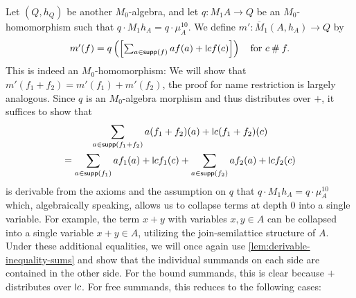 \documentclass[11pt,a4paper]{amsart}
\newcommand{\fresh}{\mathbin{\#}}
\newcommand{\supp}{\mathsf{supp}}
\newcommand{\mbar}{\overline{M}_1}
\theoremstyle{plain}
\newcommand{\midmid}{\hspace{0.2ex}{\rule[-0.1ex]{0.6pt}{1.65ex}}\hspace{0.2ex}}
\newcommand{\newletter}[1]{{\midmid}#1}
\numberwithin{equation}{section}
\newcommand{\+}[1]{\mathcal{#1}\xspace}
\theoremstyle{definition}
\begin{document}
Let \((Q, h_Q)\) be another \(M_0\)-algebra, and let \(q\colon M_1A \to Q\) be an $M_0$-homomorphism such that \(q \cdot M_1h_A = q \cdot \mu^{10}_A\).
We define \(m'\colon \mbar(A, h_A) \to Q\) by
\begin{equation*}\textstyle
  m'(f) = q\left( \left[ \sum_{a \in \supp(f)} a f(a) + \newletter{c} f(c) \right] \right) \quad \text{for } c \fresh f.
\end{equation*}
This is indeed an \(M_0\)-homomorphism: We will show that \(m'(f_1 + f_2) = m'(f_1) + m'(f_2)\), the proof for name restriction is largely analogous.
Since $q$ is an $M_0$-algebra morphism and thus distributes over $+$, it suffices to show that
\begin{gather*}
  \sum_{a \in \supp(f_1 + f_2)} a (f_1 + f_2)(a) + \newletter{c} (f_1 + f_2)(c) \\
  = \sum_{a \in \supp(f_1)} a f_1(a) + \newletter{c} f_1(c) + \sum_{a \in \supp(f_2)} a f_2(a) + \newletter{c} f_2(c)
\end{gather*}
is derivable from the axioms and the
assumption on $q$ that $q \cdot M_1h_A = q \cdot \mu^{10}_A$ which, algebraically speaking, allows us to collapse terms at depth $0$ into a single variable. For example, the term $x+y$ with variables $x,y \in A$ can be collapsed into a single variable $x+y \in A$, utilizing the join-semilattice structure of $A$.
Under these additional equalities, we will once again use \cref{lem:derivable-inequality-sums} and show that the
individual summands on each side are contained in the other side.  For
the bound summands, this is clear because $+$ distributes over
$\newletter{c}$.  For free summands, this reduces to the following cases:
\end{document}
